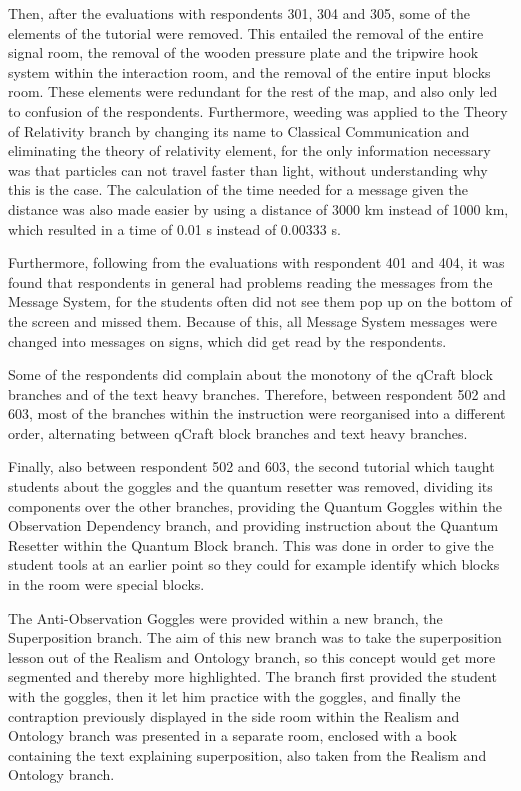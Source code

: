 \documentclass[11pt,twoside]{report} %
\begin{document}
Then, after the evaluations with respondents 301, 304 and 305, some of the elements of the tutorial were removed. This entailed the removal of the entire signal room, the removal of the wooden pressure plate and the tripwire hook system within the interaction room, and the removal of the entire input blocks room. These elements were redundant for the rest of the map, and also only led to confusion of the respondents. Furthermore, weeding was applied to the Theory of Relativity branch by changing its name to Classical Communication and eliminating the theory of relativity element, for the only information necessary was that particles can not travel faster than light, without understanding why this is the case. The calculation of the time needed for a message given the distance was also made easier by using a distance of 3000 km instead of 1000 km, which resulted in a time of 0.01 s instead of 0.00333 s.

Furthermore, following from the evaluations with respondent 401 and 404, it was found that respondents in general had problems reading the messages from the Message System, for the students often did not see them pop up on the bottom of the screen and missed them. Because of this, all Message System messages were changed into messages on signs, which did get read by the respondents.

Some of the respondents did complain about the monotony of the qCraft block branches and of the text heavy branches. Therefore, between respondent 502 and 603, most of the branches within the instruction were reorganised into a different order, alternating between qCraft block branches and text heavy branches.

Finally, also between respondent 502 and 603, the second tutorial which taught students about the goggles and the quantum resetter was removed, dividing its components over the other branches, providing the Quantum Goggles within the Observation Dependency branch, and providing instruction about the Quantum Resetter within the Quantum Block branch. This was done in order to give the student  tools at an earlier point so they could for example identify which blocks in the room were special blocks.

The Anti-Observation Goggles were provided within a new branch, the Superposition branch. The aim of this new branch was to take the superposition lesson out of the Realism and Ontology branch, so this concept would get more segmented and thereby more highlighted. The branch first provided the student with the goggles, then it let him practice with the goggles, and finally the contraption previously displayed in the side room within the Realism and Ontology branch was presented in a separate room, enclosed with a book containing the text explaining superposition, also taken from the Realism and Ontology branch.
\end{document}
